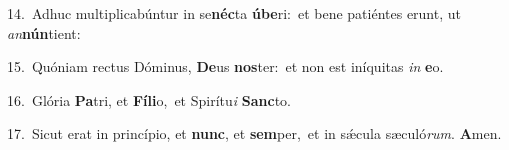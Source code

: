 {\numbfont\textcolor{\numbcolor}{14.}}~Adhuc multiplicabúntur in se\-\textbf{néc}\-ta \textbf{ú}\-\textbf{be}ri:~\star et bene patiéntes erunt, ut \textit{an}\-\textbf{nún}tient:\par
{\numbfont\textcolor{\numbcolor}{15.}}~Quóniam rectus Dóminus, \textbf{De}\-us \textbf{nos}\-ter:~\star et non est iníquitas \textit{in} \textbf{e}\-o.\par
{\numbfont\textcolor{\numbcolor}{16.}}~Glória \textbf{Pa}\-tri, et \textbf{Fí}\-\textbf{li}o,~\star et Spirítu\textit{i} \textbf{Sanc}\-to.\par
{\numbfont\textcolor{\numbcolor}{17.}}~Sicut erat in princípio, et \textbf{nunc}\-, et \textbf{sem}\-per,~\star et in sǽcula sæculó\-\textit{rum}\-. \textbf{A}\-men.\par
